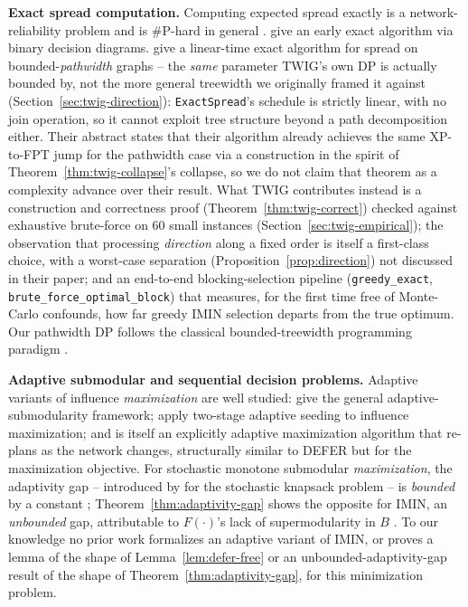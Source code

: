 \documentclass[ijoc,sglanonrev]{informs4}
\newcommand{\FF}{F}
\begin{document}
\textbf{Exact spread computation.} Computing expected spread exactly is a
network-reliability problem and is \#P-hard in general
\citep{valiant1979,provan1983}. \citet{maehara2017} give an early exact
algorithm via binary decision diagrams. \citet{nakamura2026} give a
linear-time exact algorithm for spread on bounded-\emph{pathwidth}
graphs -- the \emph{same} parameter TWIG's own DP is actually bounded by,
not the more general treewidth we originally framed it against
(Section~\ref{sec:twig-direction}): \texttt{ExactSpread}'s schedule is
strictly linear, with no join operation, so it cannot exploit tree
structure beyond a path decomposition either. Their abstract states that
their algorithm already achieves the same XP-to-FPT jump for the pathwidth
case via a construction in the spirit of
Theorem~\ref{thm:twig-collapse}'s collapse, so we do not claim that
theorem as a complexity advance over their result. What TWIG contributes
instead is a construction and correctness proof
(Theorem~\ref{thm:twig-correct}) checked against exhaustive brute-force on
60 small instances (Section~\ref{sec:twig-empirical}); the observation
that processing \emph{direction} along a fixed order is itself a
first-class choice, with a worst-case separation
(Proposition~\ref{prop:direction}) not discussed in their paper; and an
end-to-end blocking-selection pipeline (\texttt{greedy\_exact},
\texttt{brute\_force\_optimal\_block}) that measures, for the first time
free of Monte-Carlo confounds, how far greedy IMIN selection departs from
the true optimum. Our pathwidth DP follows the classical bounded-treewidth
programming paradigm \citep{bodlaender1988,cygan2015}.

\textbf{Adaptive submodular and sequential decision problems.} Adaptive
variants of influence \emph{maximization} are well studied:
\citet{golovinkrause2011} give the general adaptive-submodularity
framework; \citet{seemansinger2013} apply two-stage adaptive seeding to
influence maximization; and \citet{tong2017} is itself an explicitly
adaptive maximization algorithm that re-plans as the network changes,
structurally similar to DEFER but for the maximization objective. For
stochastic monotone submodular \emph{maximization}, the adaptivity gap --
introduced by \citet{deangoemansvondrak2008} for the stochastic knapsack
problem -- is \emph{bounded} by a constant
\citep{asadpournazerzadeh2016}; Theorem~\ref{thm:adaptivity-gap} shows the
opposite for IMIN, an \emph{unbounded} gap, attributable to
$\FF(\cdot)$'s lack of supermodularity in $B$
\citep[established by][]{xie2023}. To our knowledge no prior
work formalizes an adaptive variant of IMIN, or proves a lemma of the
shape of Lemma~\ref{lem:defer-free} or an unbounded-adaptivity-gap result
of the shape of Theorem~\ref{thm:adaptivity-gap}, for this minimization
problem.
\end{document}
